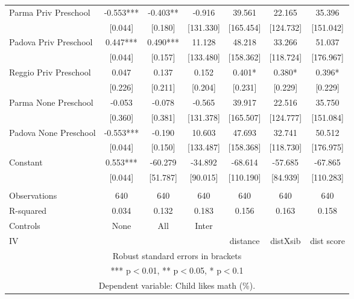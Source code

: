 \begin{tabular}{lcccccc}
Parma Priv Preschool & -0.553*** & -0.403** & -0.916 & 39.561 & 22.165 & 35.396 \\
 & [0.044] & [0.180] & [131.330] & [165.454] & [124.732] & [151.042] \\
Padova Priv Preschool & 0.447*** & 0.490*** & 11.128 & 48.218 & 33.266 & 51.037 \\
 & [0.044] & [0.157] & [133.480] & [158.362] & [118.724] & [176.967] \\
Reggio Priv Preschool & 0.047 & 0.137 & 0.152 & 0.401* & 0.380* & 0.396* \\
 & [0.226] & [0.211] & [0.204] & [0.231] & [0.229] & [0.229] \\
Parma None Preschool & -0.053 & -0.078 & -0.565 & 39.917 & 22.516 & 35.750 \\
 & [0.360] & [0.381] & [131.378] & [165.507] & [124.777] & [151.084] \\
Padova None Preschool & -0.553*** & -0.190 & 10.603 & 47.693 & 32.741 & 50.512 \\
 & [0.044] & [0.150] & [133.487] & [158.368] & [118.730] & [176.975] \\
Constant & 0.553*** & -60.279 & -34.892 & -68.614 & -57.685 & -67.865 \\
 & [0.044] & [51.787] & [90.015] & [110.190] & [84.939] & [110.283] \\
 &  &  &  &  &  &  \\
Observations & 640 & 640 & 640 & 640 & 640 & 640 \\
R-squared & 0.034 & 0.132 & 0.183 & 0.156 & 0.163 & 0.158 \\
Controls & None & All & Inter &  &  &  \\
 IV &  &  &  & distance & distXsib & dist score \\ \hline
\multicolumn{7}{c}{ Robust standard errors in brackets} \\
\multicolumn{7}{c}{ *** p$<$0.01, ** p$<$0.05, * p$<$0.1} \\
\multicolumn{7}{c}{ Dependent variable: Child likes math (\%).} \\
\end{tabular}
